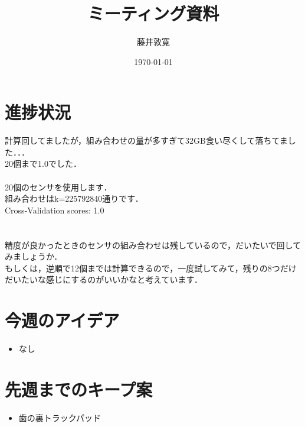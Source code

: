 \documentclass[a4j,twocolumn,10pt]{jarticle}
\title{ミーティング資料}
\author{藤井敦寛}
\date{\today}
\begin{document}
\maketitle

\section{進捗状況}
計算回してましたが，組み合わせの量が多すぎて32GB食い尽くして落ちてました．．．\\
20個まで1.0でした．\\\\
20個のセンサを使用します．\\
組み合わせはk=225792840通りです．\\
Cross-Validation scores: 1.0\\
\\\\
精度が良かったときのセンサの組み合わせは残しているので，だいたいで回してみましょうか．\\
もしくは，逆順で12個までは計算できるので，一度試してみて，残りの8つだけだいたいな感じにするのがいいかなと考えています．



\section{今週のアイデア}
\begin{itemize}
  \item なし
\end{itemize}

\section{先週までのキープ案}
\begin{itemize}
  \item 歯の裏トラックパッド
\end{itemize}
\end{document}

